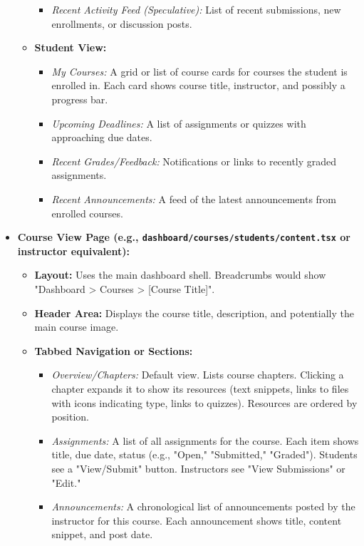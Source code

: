 \begin{itemize}
\begin{itemize}
\begin{itemize}
            \item \textit{Recent Activity Feed (Speculative):} List of recent submissions, new enrollments, or discussion posts.
        \end{itemize}
        \item \textbf{Student View:}
        \begin{itemize}
            \item \textit{My Courses:} A grid or list of course cards for courses the student is enrolled in. Each card shows course title, instructor, and possibly a progress bar.
            \item \textit{Upcoming Deadlines:} A list of assignments or quizzes with approaching due dates.
            \item \textit{Recent Grades/Feedback:} Notifications or links to recently graded assignments.
            \item \textit{Recent Announcements:} A feed of the latest announcements from enrolled courses.
        \end{itemize}
    \end{itemize}
    \item \textbf{Course View Page (e.g., \texttt{dashboard/courses/students/content.tsx} or instructor equivalent):}
    \begin{itemize}
        \item \textbf{Layout:} Uses the main dashboard shell. Breadcrumbs would show "Dashboard > Courses > [Course Title]".
        \item \textbf{Header Area:} Displays the course title, description, and potentially the main course image.
        \item \textbf{Tabbed Navigation or Sections:}
        \begin{itemize}
            \item \textit{Overview/Chapters:} Default view. Lists course chapters. Clicking a chapter expands it to show its resources (text snippets, links to files with icons indicating type, links to quizzes). Resources are ordered by position.
            \item \textit{Assignments:} A list of all assignments for the course. Each item shows title, due date, status (e.g., "Open," "Submitted," "Graded"). Students see a "View/Submit" button. Instructors see "View Submissions" or "Edit."
            \item \textit{Announcements:} A chronological list of announcements posted by the instructor for this course. Each announcement shows title, content snippet, and post date.

\end{itemize}
\end{itemize}
\end{itemize}
